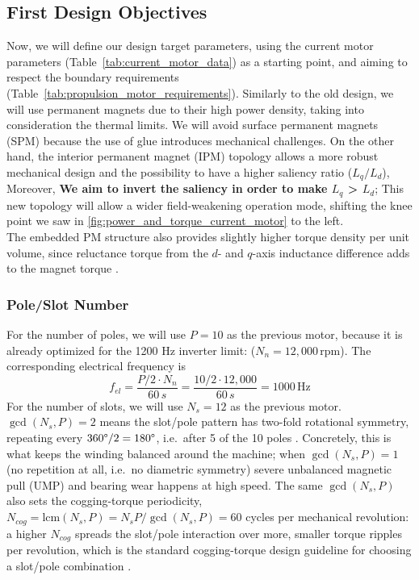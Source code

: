 \documentclass[11pt,a4paper]{article}
\begin{document}
\subsection{First Design Objectives}
Now, we will define our design target parameters, using the current motor parameters (Table~\ref{tab:current_motor_data}) as a starting point, and aiming to respect the boundary requirements (Table~\ref{tab:propulsion_motor_requirements}).
Similarly to the old design, we will use permanent magnets due to their high power density, taking into consideration the thermal limits. We will avoid surface permanent magnets (SPM) because the use of glue introduces mechanical challenges. On the other hand, the interior permanent magnet (IPM) topology allows a more robust mechanical design and the possibility to have a higher saliency ratio ($L_q/L_d$), Moreover, \textbf{We aim to invert the saliency in order to make $L_q$ > $L_d$}; This new topology will allow a wider field-weakening operation mode, shifting the knee point we saw in \ref{fig:power_and_torque_current_motor} to the left. \\
The embedded PM structure also provides slightly higher torque density per unit volume, since reluctance torque from the $d$- and $q$-axis inductance difference adds to the magnet torque \cite{LeiXu2019}.
\subsubsection*{Pole/Slot Number}
\label{sec:pole_slot_number}
For the number of poles, we will use $P=10$ as the previous motor, because it is already optimized for the 1200 Hz inverter limit: ($N_n = 12,000\,\text{rpm}$).
The corresponding electrical frequency is
\begin{equation}
    f_{el} = \frac{P/2\cdot N_n}{60\,s} = \frac{10/2 \cdot 12,000}{60\,s} = 1000\,\text{Hz}
\end{equation}
For the number of slots, we will use $N_s = 12$ as the previous motor. $\gcd(N_s,P)=2$ means the slot/pole pattern has two-fold rotational symmetry, repeating every $360\text{\textdegree{}}/2=180\text{\textdegree{}}$, i.e.\ after 5 of the 10 poles \cite{Lipo2017}. Concretely, this is what keeps the winding balanced around the machine; when $\gcd(N_s,P)=1$ (no repetition at all, i.e.\ no diametric symmetry) severe unbalanced magnetic pull (UMP) and bearing wear happens at high speed. The same $\gcd(N_s,P)$ also sets the cogging-torque periodicity, $N_{cog}=\mathrm{lcm}(N_s,P)=N_sP/\gcd(N_s,P)=60$ cycles per mechanical revolution: a higher $N_{cog}$ spreads the slot/pole interaction over more, smaller torque ripples per revolution, which is the standard cogging-torque design guideline for choosing a slot/pole combination \cite{ZhuHowe2000}.
\end{document}
